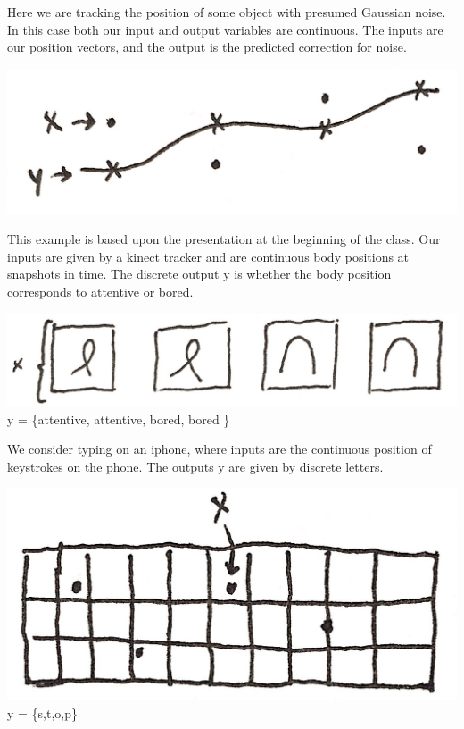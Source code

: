 \documentclass{article}
\begin{document}
\begin{example}[Tracking]
Here we are tracking the position of some object with presumed Gaussian noise. In this case both our input and output variables are continuous. The inputs are our position vectors, and the output is the predicted correction for noise.
\begin{center}
\includegraphics[scale=.1]{Tracking} 
\end{center}
\end{example}
\begin{example}[Education]
This example is based upon the presentation at the beginning of the class. Our inputs are given by a kinect tracker and are continuous body positions at snapshots in time. The discrete output y is whether the body position corresponds to attentive or bored.
\begin{center}
\includegraphics[scale=.1]{education} \\
y = \{attentive, attentive, bored, bored \}
\end{center}
\end{example}
\begin{example}
We consider typing on an iphone, where inputs are the continuous position of keystrokes on the phone. The outputs y are given by discrete letters.
\begin{center}
\includegraphics[scale=.1]{TouchTyping} \\
y = \{s,t,o,p\}
\end{center}
\end{example}
\end{document}
